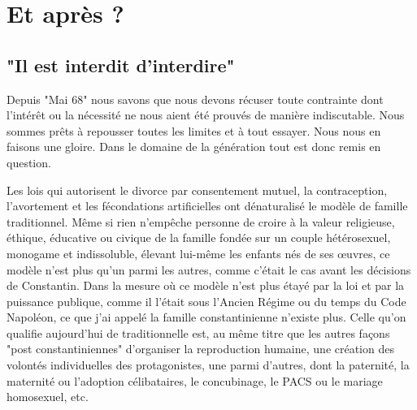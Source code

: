 


 \chapter[Et après ?]{Et après ?}


\section{"Il est interdit d'interdire"} 

  Depuis "Mai 68" nous savons que nous devons récuser toute contrainte dont l'intérêt ou la nécessité ne nous aient été prouvés de manière indiscutable. Nous sommes prêts à repousser toutes les limites et à tout essayer. Nous nous en faisons une gloire. Dans le domaine de la génération tout est donc remis en question. 
  
  Les lois qui autorisent le divorce par consentement mutuel, la contraception, l'avortement et les fécondations artificielles ont dénaturalisé le modèle de famille traditionnel. Même si rien n'empêche personne de croire à la valeur religieuse, éthique, éducative ou civique de la famille fondée sur un couple hétérosexuel, monogame et indissoluble, élevant lui-même les enfants nés de ses œuvres, ce modèle n'est plus qu'un parmi les autres, comme c'était le cas avant les décisions de Constantin. Dans la mesure où ce modèle n'est plus étayé par la loi et par la puissance publique, comme il l'était sous l'Ancien Régime ou du temps du Code Napoléon, ce que j'ai appelé la famille constantinienne n'existe plus. Celle qu'on qualifie aujourd'hui de traditionnelle est, au même titre que les autres façons "post constantiniennes" d'organiser la reproduction humaine, une création des volontés individuelles des protagonistes, une parmi d'autres, dont la paternité, la maternité ou l'adoption célibataires, le concubinage, le PACS ou le mariage homosexuel, etc.
  
